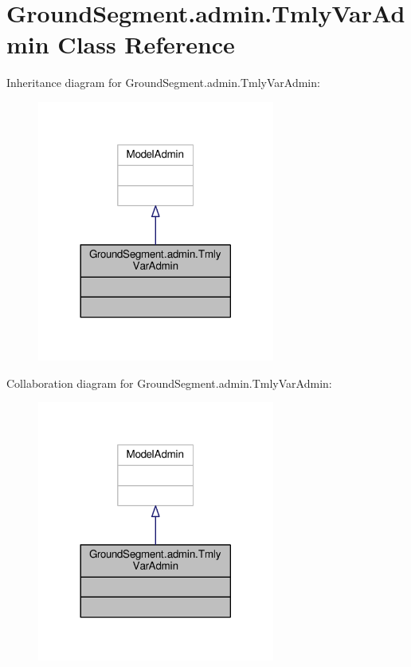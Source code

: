 \hypertarget{class_ground_segment_1_1admin_1_1_tmly_var_admin}{}\section{Ground\+Segment.\+admin.\+Tmly\+Var\+Admin Class Reference}
\label{class_ground_segment_1_1admin_1_1_tmly_var_admin}


Inheritance diagram for Ground\+Segment.\+admin.\+Tmly\+Var\+Admin\+:\nopagebreak
\begin{figure}[H]
\begin{center}
\leavevmode
\includegraphics[width=221pt]{class_ground_segment_1_1admin_1_1_tmly_var_admin__inherit__graph}
\end{center}
\end{figure}


Collaboration diagram for Ground\+Segment.\+admin.\+Tmly\+Var\+Admin\+:\nopagebreak
\begin{figure}[H]
\begin{center}
\leavevmode
\includegraphics[width=221pt]{class_ground_segment_1_1admin_1_1_tmly_var_admin__coll__graph}
\end{center}
\end{figure}


